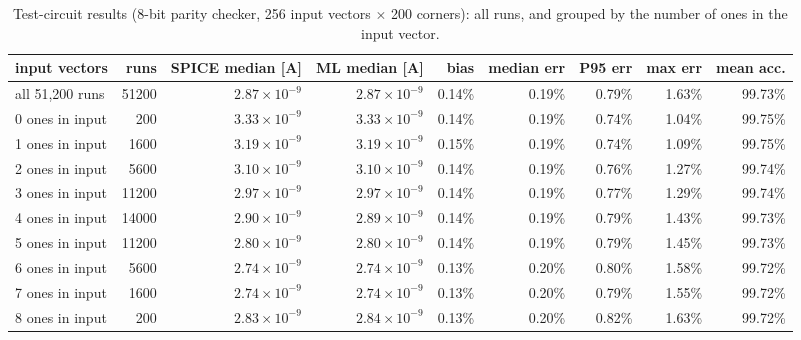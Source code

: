 \begin{table}[H]
\centering
{\small
\begin{adjustbox}{max width=\linewidth}
\begin{tabular}{lrrrrrrrr}
\toprule
input vectors & runs & SPICE median [A] & ML median [A] & bias & median err & P95 err & max err & mean acc. \\
\midrule
all 51,200 runs & 51200 & $2.87\times10^{-9}$ & $2.87\times10^{-9}$ & 0.14\% & 0.19\% & 0.79\% & 1.63\% & 99.73\% \\
0 ones in input & 200 & $3.33\times10^{-9}$ & $3.33\times10^{-9}$ & 0.14\% & 0.19\% & 0.74\% & 1.04\% & 99.75\% \\
1 ones in input & 1600 & $3.19\times10^{-9}$ & $3.19\times10^{-9}$ & 0.15\% & 0.19\% & 0.74\% & 1.09\% & 99.75\% \\
2 ones in input & 5600 & $3.10\times10^{-9}$ & $3.10\times10^{-9}$ & 0.14\% & 0.19\% & 0.76\% & 1.27\% & 99.74\% \\
3 ones in input & 11200 & $2.97\times10^{-9}$ & $2.97\times10^{-9}$ & 0.14\% & 0.19\% & 0.77\% & 1.29\% & 99.74\% \\
4 ones in input & 14000 & $2.90\times10^{-9}$ & $2.89\times10^{-9}$ & 0.14\% & 0.19\% & 0.79\% & 1.43\% & 99.73\% \\
5 ones in input & 11200 & $2.80\times10^{-9}$ & $2.80\times10^{-9}$ & 0.14\% & 0.19\% & 0.79\% & 1.45\% & 99.73\% \\
6 ones in input & 5600 & $2.74\times10^{-9}$ & $2.74\times10^{-9}$ & 0.13\% & 0.20\% & 0.80\% & 1.58\% & 99.72\% \\
7 ones in input & 1600 & $2.74\times10^{-9}$ & $2.74\times10^{-9}$ & 0.13\% & 0.20\% & 0.79\% & 1.55\% & 99.72\% \\
8 ones in input & 200 & $2.83\times10^{-9}$ & $2.84\times10^{-9}$ & 0.13\% & 0.20\% & 0.82\% & 1.63\% & 99.72\% \\
\bottomrule
\end{tabular}
\end{adjustbox}
}
\caption{Test-circuit results (8-bit parity checker, 256 input vectors $\times$ 200 corners): all runs, and grouped by the number of ones in the input vector.}
\label{tab:circuit}
\end{table}

